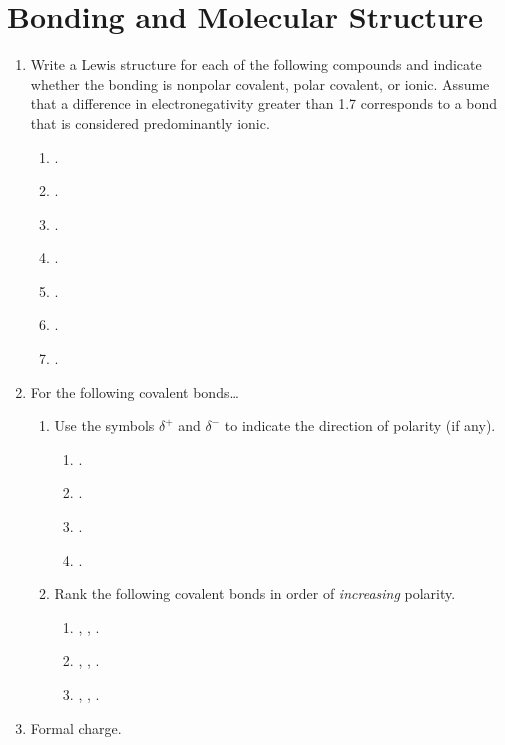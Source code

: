 \documentclass[../psets.tex]{subfiles}
\begin{document}
\section{Bonding and Molecular Structure}
\begin{enumerate}
    \item {}Write a Lewis structure for each of the following compounds and indicate whether the bonding is nonpolar covalent, polar covalent, or ionic. Assume that a difference in electronegativity greater than 1.7 corresponds to a bond that is considered predominantly ionic.
    \begin{enumerate}
        \item {}.
        \item {}.
        \item {}.
        \item {}.
        \item {}.
        \item {}.
        \item {}.
    \end{enumerate}
    \item For the following covalent bonds\dots
    \begin{enumerate}
        \item Use the symbols $\delta^+$ and $\delta^-$ to indicate the direction of polarity (if any).
        \begin{enumerate}
            \item {}.
            \item {}.
            \item {}.
            \item {}.
        \end{enumerate}
        \item Rank the following covalent bonds in order of \emph{increasing} polarity.
        \begin{enumerate}
            \item {}, , .
            \item {}, , .
            \item {}, , .
        \end{enumerate}
    \end{enumerate}
    \item Formal charge.
    \begin{enumerate}

\end{enumerate}
\end{enumerate}
\end{document}
